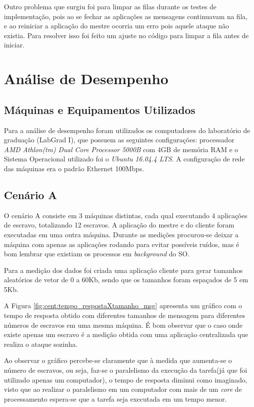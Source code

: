 \documentclass[
	12pt,				%
    oneside,			%
	a4paper,			%
	english,			%
	brazil,				%
	]{abntex2}
\begin{document}
Outro problema que surgiu foi para limpar as filas durante os testes de implementação, pois ao se fechar as aplicações as mensagens continuavam na fila, e ao reiniciar a aplicação do mestre ocorria um erro pois aquele ataque não existia. Para resolver isso foi feito um ajuste no código para limpar a fila antes de iniciar.


\chapter{Análise de Desempenho} 

\section{Máquinas e Equipamentos Utilizados}

Para a análise de desempenho foram utilizados os computadores do laboratório de graduação (LabGrad I), que possuem as seguintes configurações: processador \textit{AMD Athlon(tm) Dual Core Processor 5000B} com 4GB de memória RAM e o Sistema Operacional utilizado foi o \textit{Ubuntu 16.04.4 LTS}. A configuração de rede das máquinas era o padrão Ethernet 100Mbps.

\section{Cenário A}

O cenário A consiste em 3 máquinas distintas, cada qual executando 4 aplicações de escravo, totalizando 12 escravos. A aplicação do mestre e do cliente foram executadas em uma outra máquina. Durante as medições procurou-se deixar a máquina com apenas as aplicações rodando para evitar possíveis ruídos, mas é bom lembrar que existiam os processos em \textit{background} do SO. 

Para a medição dos dados foi criada uma aplicação cliente para gerar tamanhos aleatórios de vetor de 0 a 60Kb, sendo que os
tamanhos foram espaçados de 5 em 5Kb.



A Figura \ref{fig:cent:tempo_respostaXtamanho_msg} apresenta um gráfico com o tempo de resposta obtido com diferentes tamanhos de mensagem para diferentes números de escravos em uma mesma máquina. É bom observar que o caso onde existe apenas um escravo é a medição obtida com uma aplicação centralizada que realiza o ataque sozinha.

Ao observar o gráfico percebe-se claramente que à medida que aumenta-se o número de escravos, ou seja, faz-se o paralelismo da 
execução da tarefa(já que foi utilizado apenas um computador), o tempo de resposta diminui como imaginado, visto que ao
realizar o paralelismo em um computador com mais de um \textit{core} de processamento espera-se que a tarefa seja executada
em um tempo menor.
\end{document}
